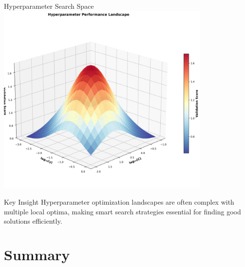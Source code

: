 \documentclass[8pt,aspectratio=1610]{beamer}
\begin{document}
\begin{frame}{Hyperparameter Search Space}
\centering
\includegraphics[width=0.8\textwidth]{../figures/hyperparameter_surface.png}

\vspace{0.3cm}

\begin{alertblock}{Key Insight}
Hyperparameter optimization landscapes are often complex with multiple local optima, making smart search strategies essential for finding good solutions efficiently.
\end{alertblock}
\end{frame}


\section{Summary}
\end{document}
